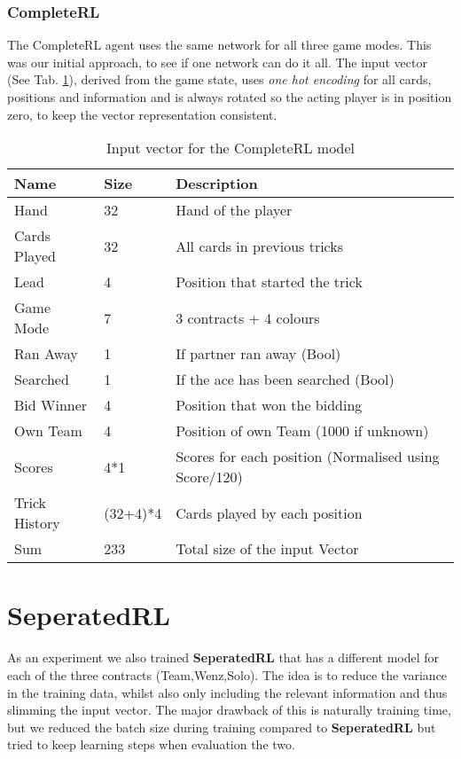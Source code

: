 {\subsubsection{CompleteRL}
The CompleteRL agent uses the same network for all three game modes.
This was our initial approach, to see if one network can do it all.
The input vector (See Tab. \ref{tab:CompleteRLinput}), derived from the game state, uses \textit{one hot encoding}
for all cards, positions and information and is always rotated so the acting player is in position zero, to keep the
vector representation
consistent.\\
\begin{table}[!h]
\centering
\begin{tabular}{lll}
\toprule
Name          & Size     & Description                                           \\
\midrule
Hand          & 32       & Hand of the player                                    \\
Cards Played  & 32       & All cards in previous tricks                          \\
Lead          & 4        & Position that started the trick                       \\
Game Mode     & 7        & 3 contracts + 4 colours                               \\
Ran Away      & 1        & If partner ran away (Bool)                            \\
Searched      & 1        & If the ace has been searched (Bool)                   \\
Bid Winner    & 4        & Position that won the bidding                         \\
Own Team      & 4        & Position of own Team (1000 if unknown)                \\
Scores        & 4*1      & Scores for each position (Normalised using Score/120) \\
Trick History & (32+4)*4 & Cards played by each position                        \\
\midrule
Sum & 233 & Total size of the input Vector\\
\bottomrule
\end{tabular}
\caption{Input vector for the CompleteRL model}
\label{tab:CompleteRLinput}
\end{table}

\section{SeperatedRL}
As an experiment we also trained \textbf{SeperatedRL} that has a different model for each of the three contracts
(Team,Wenz,Solo).
The idea is to reduce the variance in the training data, whilst also only including the relevant information and thus
slimming the input vector.
The major drawback of this is naturally training time, but we reduced the batch size during training compared to
\textbf{SeperatedRL} but tried to keep learning steps when evaluation the two.

}
